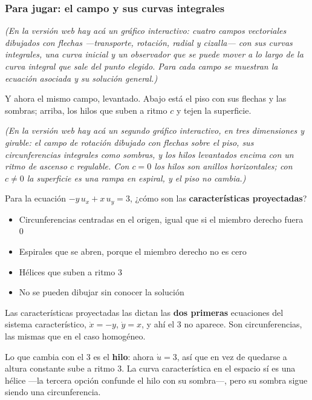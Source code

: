 \documentclass[
  spanish,
  a4paper,
]{scrbook}
\providecommand{\tightlist}{%
  \setlength{\itemsep}{0pt}\setlength{\parskip}{0pt}}
\theoremstyle{definition}
\theoremstyle{plain}
\theoremstyle{definition}
\theoremstyle{plain}
\theoremstyle{definition}
\theoremstyle{remark}
\begin{document}
\subsubsection{Para jugar: el campo y sus curvas
integrales}\label{sec-lienzo-campo}

\emph{(En la versión web hay acá un gráfico interactivo: cuatro campos
vectoriales dibujados con flechas ---transporte, rotación, radial y
cizalla--- con sus curvas integrales, una curva inicial y un observador
que se puede mover a lo largo de la curva integral que sale del punto
elegido. Para cada campo se muestran la ecuación asociada y su solución
general.)}

Y ahora el mismo campo, levantado. Abajo está el piso con sus flechas y
las sombras; arriba, los hilos que suben a ritmo \(c\) y tejen la
superficie.

\emph{(En la versión web hay acá un segundo gráfico interactivo, en tres
dimensiones y girable: el campo de rotación dibujado con flechas sobre
el piso, sus circunferencias integrales como sombras, y los hilos
levantados encima con un ritmo de ascenso \(c\) regulable. Con \(c=0\)
los hilos son anillos horizontales; con \(c \neq 0\) la superficie es
una rampa en espiral, y el piso no cambia.)}

Para la ecuación \(-y\,u_x + x\,u_y = 3\), ¿cómo son las
\textbf{características proyectadas}?

\begin{itemize}
\tightlist
\item
  {Circunferencias centradas en el origen, igual que si el miembro
  derecho fuera \(0\)}
\item
  {Espirales que se abren, porque el miembro derecho no es cero}
\item
  {Hélices que suben a ritmo \(3\)}
\item
  {No se pueden dibujar sin conocer la solución}
\end{itemize}

Las características proyectadas las dictan las \textbf{dos primeras}
ecuaciones del sistema característico, \(\dot x = -y\), \(\dot y = x\),
y ahí el \(3\) no aparece. Son circunferencias, las mismas que en el
caso homogéneo.

Lo que cambia con el \(3\) es el \textbf{hilo}: ahora \(\dot u = 3\),
así que en vez de quedarse a altura constante sube a ritmo \(3\). La
curva característica en el espacio sí es una hélice ---la tercera opción
confunde el hilo con su sombra---, pero su sombra sigue siendo una
circunferencia.
\end{document}

